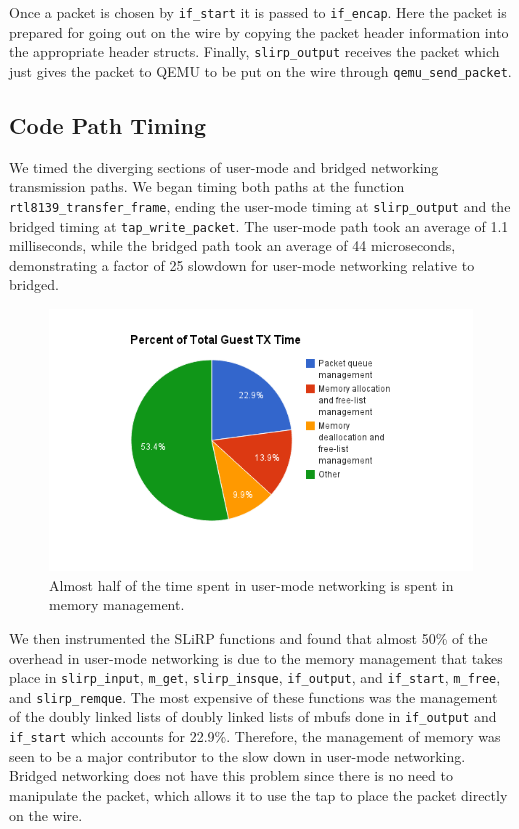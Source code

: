 Once a packet is chosen by \texttt{if\_start} it is passed to \texttt{if\_encap}.
Here the packet is prepared for going out on the wire by copying the packet header information into the appropriate header structs.
Finally, \texttt{slirp\_output} receives the packet which just gives the packet to QEMU to be put on the wire through \texttt{qemu\_send\_packet}. 

\subsection{Code Path Timing}
\label{codePathTiming}
We timed the diverging sections of user-mode and bridged networking transmission paths. 
We began timing both paths at the function \texttt{rtl8139\_transfer\_frame}, ending the user-mode timing at \texttt{slirp\_output} and the bridged timing at \texttt{tap\_write\_packet}. 
The user-mode path took an average of 1.1 milliseconds, while the bridged path took an average of 44 microseconds, demonstrating a factor of 25 slowdown for user-mode networking relative to bridged.

\begin{figure}[!htbp]
	\centering
		\includegraphics[scale=0.5]{usermodeTXtime}
	\caption{Almost half of the time spent in user-mode networking is spent in memory management.}
	\label{fig:usermodeTXtime}
\end{figure}

We then instrumented the SLiRP functions and found that almost 50\% of the overhead in user-mode networking is due to the memory management that takes place in \texttt{slirp\_input},
\texttt{m\_get}, \texttt{slirp\_insque}, \texttt{if\_output}, and \texttt{if\_start}, \texttt{m\_free}, and \texttt{slirp\_remque}.
The most expensive of these functions was the management of the doubly linked lists of doubly linked lists of mbufs done in \texttt{if\_output} and \texttt{if\_start} which accounts for 22.9\%.
Therefore, the management of memory was seen to be a major contributor to the slow down in user-mode networking.
Bridged networking does not have this problem since there is no need to manipulate the packet, which allows it to use the tap to place the packet directly on the wire.

